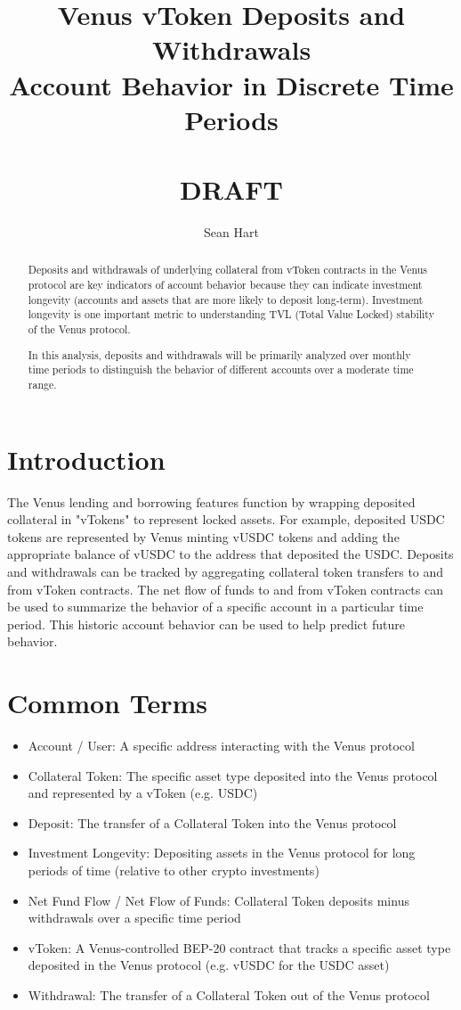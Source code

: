 \documentclass[12pt]{article}
\title{Venus vToken Deposits and Withdrawals \\
    \large Account Behavior in Discrete Time Periods \\~\\
    \large DRAFT}
\author{Sean Hart}
\begin{document}
    \maketitle

    \begin{abstract}
        \setlength\parskip{1em}
        \noindent Deposits and withdrawals of underlying collateral from vToken contracts in the Venus protocol are key indicators of account behavior because they can indicate investment longevity (accounts and assets that are more likely to deposit long-term). Investment longevity is one important metric to understanding TVL (Total Value Locked) stability of the Venus protocol.

        \noindent In this analysis, deposits and withdrawals will be primarily analyzed over monthly time periods to distinguish the behavior of different accounts over a moderate time range.
    \end{abstract}

    \section*{Introduction}
        The Venus lending and borrowing features function by wrapping deposited collateral in "vTokens" to represent locked assets. For example, deposited USDC tokens are represented by Venus minting vUSDC tokens and adding the appropriate balance of vUSDC to the address that deposited the USDC. Deposits and withdrawals can be tracked by aggregating collateral token transfers to and from vToken contracts. The net flow of funds to and from vToken contracts can be used to summarize the behavior of a specific account in a particular time period. This historic account behavior can be used to help predict future behavior.

    \section*{Common Terms}
        \begin{itemize}{}{}
            \item Account / User: A specific address interacting with the Venus protocol
            \item Collateral Token: The specific asset type deposited into the Venus protocol and represented by a vToken (e.g. USDC)
            \item Deposit: The transfer of a Collateral Token into the Venus protocol
            \item Investment Longevity: Depositing assets in the Venus protocol for long periods of time (relative to other crypto investments)
            \item Net Fund Flow / Net Flow of Funds: Collateral Token deposits minus withdrawals over a specific time period
            \item vToken: A Venus-controlled BEP-20 contract that tracks a specific asset type deposited in the Venus protocol (e.g. vUSDC for the USDC asset)
            \item Withdrawal: The transfer of a Collateral Token out of the Venus protocol
        \end{itemize}
\end{document}
